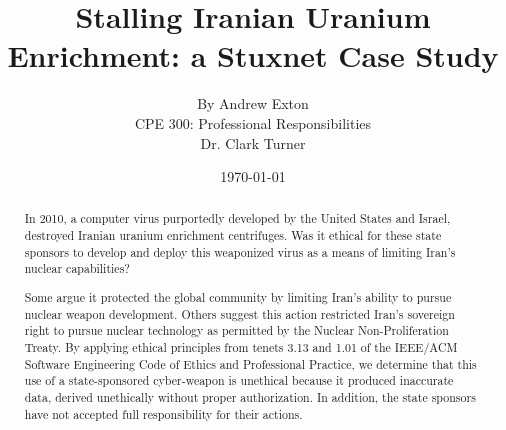 \documentclass[12pt]{article}
\begin{document}
\title{\vfill Stalling Iranian Uranium Enrichment: a Stuxnet Case Study } %
\author{
By Andrew Exton \vspace{10pt} \\
CPE 300: Professional Responsibilities  \vspace{10pt} \\
Dr. Clark Turner \vspace{10pt} \\
}
\date{\today} %

\maketitle

\vfill  %
\begin{abstract}

In 2010, a computer virus purportedly developed by the United States and Israel, destroyed Iranian uranium enrichment centrifuges.\cite{theRealStoryOfStuxnet} Was it ethical for these state sponsors to develop and deploy this weaponized virus as a means of limiting Iran’s nuclear capabilities?

Some argue it protected the global community by limiting Iran's ability to pursue nuclear weapon development.\cite{theRealStoryOfStuxnet} Others suggest this action restricted Iran's sovereign right to pursue nuclear technology as permitted by the Nuclear Non-Proliferation Treaty.\cite{lookIntoIranianNuclearProgram} By applying ethical principles from tenets 3.13 and 1.01 of the IEEE/ACM Software Engineering Code of Ethics and Professional Practice, we determine that this use of a state-sponsored cyber-weapon is unethical because it produced inaccurate data, derived unethically without proper authorization.  In addition, the state sponsors have not accepted full responsibility for their actions.


\end{abstract}

\thispagestyle{empty} %
\newpage

\tableofcontents
\newpage
\end{document}
